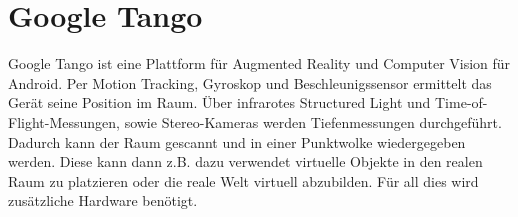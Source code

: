 
\section{Google Tango}
Google Tango ist eine Plattform für Augmented Reality und Computer Vision für Android. Per Motion Tracking, Gyroskop und Beschleunigssensor ermittelt das Gerät seine Position im Raum. Über infrarotes Structured Light und Time-of-Flight-Messungen, sowie Stereo-Kameras werden Tiefenmessungen durchgeführt. Dadurch kann der Raum gescannt und in einer Punktwolke wiedergegeben werden. Diese kann dann z.B. dazu verwendet virtuelle Objekte in den realen Raum zu platzieren oder die reale Welt virtuell abzubilden. Für all dies wird zusätzliche Hardware benötigt.\cite{fehling}